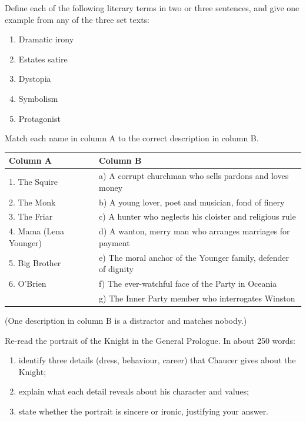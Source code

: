 \documentclass[11pt]{article}
\newcommand{\cle}[1]{{\popxbold\color{popdark}#1}}
\newcounter{popsec}
\newcounter{popsub}
\newcommand{\courssub}[1]{%
  \stepcounter{popsub}%
  \par\vspace{9pt}\noindent{\popxbold\fontsize{11.5}{13}\selectfont\color{popink}{\color{poporange}\thepopsec.\thepopsub}\hspace{6pt}#1}\par\nopagebreak\vspace{4pt}
}
\begin{document}
\begin{exercice}
Define each of the following literary terms in two or three sentences, and give one example from any of the three set texts:
\begin{enumerate}
\item \cle{Dramatic irony}
\item \cle{Estates satire}
\item \cle{Dystopia}
\item \cle{Symbolism}
\item \cle{Protagonist}
\end{enumerate}
\end{exercice}

\begin{exercice}
Match each name in column A to the correct description in column B.
\begin{center}
\begin{tabularx}{\linewidth}{|l|X|}
\hline
\rowcolor{popblueL} \textbf{Column A} & \textbf{Column B} \\
\hline
1. The Squire & a) A corrupt churchman who sells pardons and loves money \\
\hline
2. The Monk & b) A young lover, poet and musician, fond of finery \\
\hline
3. The Friar & c) A hunter who neglects his cloister and religious rule \\
\hline
4. Mama (Lena Younger) & d) A wanton, merry man who arranges marriages for payment \\
\hline
5. Big Brother & e) The moral anchor of the Younger family, defender of dignity \\
\hline
6. O'Brien & f) The ever-watchful face of the Party in Oceania \\
\hline
& g) The Inner Party member who interrogates Winston \\
\hline
\end{tabularx}
\end{center}
(One description in column B is a distractor and matches nobody.)
\end{exercice}

\courssub{I practise}

\begin{exercice}
Re-read the portrait of the Knight in the General Prologue. In about 250 words:
\begin{enumerate}
\item identify three details (dress, behaviour, career) that Chaucer gives about the Knight;
\item explain what each detail reveals about his character and values;
\item state whether the portrait is sincere or ironic, justifying your answer.
\end{enumerate}
\end{exercice}
\end{document}
